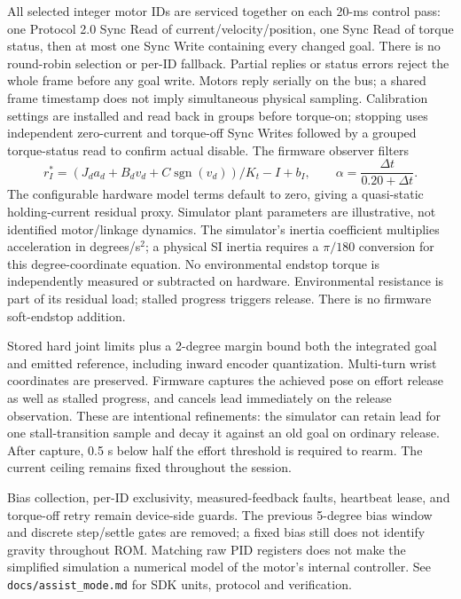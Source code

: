 \documentclass[11pt]{article}
\begin{document}
All selected integer motor IDs are serviced together on each 20-ms control
pass: one Protocol 2.0 Sync Read of current/velocity/position, one Sync Read of
torque status, then at most one Sync Write containing every changed goal.
There is no round-robin selection or per-ID fallback. Partial replies or status
errors reject the whole frame before any goal write. Motors reply serially on
the bus; a shared frame timestamp does not imply simultaneous physical sampling.
Calibration settings are installed and read back in groups before torque-on;
stopping uses independent zero-current and torque-off Sync Writes followed by
a grouped torque-status read to confirm actual disable. The
firmware observer filters
\[
 r_I^* = (J_d a_d + B_d v_d + C\operatorname{sgn}(v_d))/K_t - I + b_I,
 \qquad \alpha=\frac{\Delta t}{0.20+\Delta t}.
\]
The configurable hardware model terms default to zero, giving a quasi-static
holding-current residual proxy. Simulator plant parameters are illustrative,
not identified motor/linkage dynamics. The simulator's inertia coefficient
multiplies acceleration in degrees/s$^2$; a physical SI inertia requires a
$\pi/180$ conversion for this degree-coordinate equation.
No environmental endstop torque is independently measured or subtracted on
hardware. Environmental resistance is part of its residual load; stalled
progress triggers release. There is no firmware soft-endstop addition.

Stored hard joint limits plus a 2-degree margin bound both the integrated goal
and emitted reference, including inward encoder quantization. Multi-turn wrist
coordinates are preserved. Firmware captures the achieved pose on effort
release as well as stalled progress, and cancels lead immediately on the
release observation. These are intentional refinements: the simulator can
retain lead for one stall-transition sample and decay it against an old goal
on ordinary release. After capture, 0.5 s below half the effort threshold is
required to rearm. The current ceiling remains fixed throughout the session.

Bias collection, per-ID exclusivity, measured-feedback faults, heartbeat lease,
and torque-off retry remain device-side guards. The previous 5-degree bias
window and discrete step/settle gates are removed; a fixed bias still does not
identify gravity throughout ROM. Matching raw PID registers does not make the
simplified simulation a numerical model of the motor's internal controller.
See \texttt{docs/assist\_mode.md} for SDK units, protocol and verification.
\end{document}
